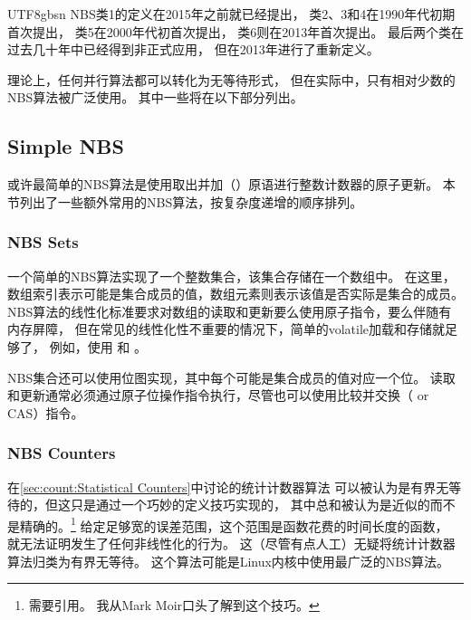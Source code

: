\begin{CJK}{UTF8}{gbsn}
NBS类1的定义在2015年之前就已经提出，
类2、3和4在1990年代初期首次提出，
类5在2000年代初首次提出，
类6则在2013年首次提出。
最后两个类在过去几十年中已经得到非正式应用，
但在2013年进行了重新定义。

\QuickQuizEnd

理论上，任何并行算法都可以转化为无等待形式，
但在实际中，只有相对少数的NBS算法被广泛使用。
其中一些将在以下部分列出。

\subsection{Simple NBS}
\label{sec:advsync:Simple NBS}

或许最简单的NBS算法是使用取出并加（）原语进行整数计数器的原子更新。
本节列出了一些额外常用的NBS算法，按复杂度递增的顺序排列。

\subsubsection{NBS Sets}
\label{sec:advsync:NBS Sets}

一个简单的NBS算法实现了一个整数集合，该集合存储在一个数组中。
在这里，数组索引表示可能是集合成员的值，数组元素则表示该值是否实际是集合的成员。
NBS算法的线性化标准要求对数组的读取和更新要么使用原子指令，要么伴随有内存屏障，
但在常见的线性化性不重要的情况下，简单的volatile加载和存储就足够了，
例如，使用  和 。

NBS集合还可以使用位图实现，其中每个可能是集合成员的值对应一个位。
读取和更新通常必须通过原子位操作指令执行，尽管也可以使用比较并交换（ or CAS）指令。

\subsubsection{NBS Counters}
\label{sec:advsync:NBS Counters}

在\cref{sec:count:Statistical Counters}中讨论的统计计数器算法
可以被认为是有界无等待的，但这只是通过一个巧妙的定义技巧实现的，
其中总和被认为是近似的而不是精确的。\footnote{
	需要引用。
	我从Mark Moir口头了解到这个技巧。}
给定足够宽的误差范围，这个范围是函数花费的时间长度的函数，
就无法证明发生了任何非线性化的行为。
这（尽管有点人工）无疑将统计计数器算法归类为有界无等待。
这个算法可能是Linux内核中使用最广泛的NBS算法。

\end{CJK}

